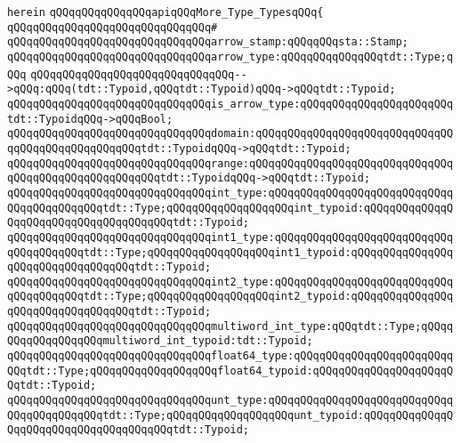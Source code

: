 \verb|herein|\newline
\newline
\verb|qQQqqQQqqQQqqQQqapiqQQqMore_Type_TypesqQQq{|\newline
\verb|qQQqqQQqqQQqqQQqqQQqqQQqqQQqqQQq#|\newline
\verb|qQQqqQQqqQQqqQQqqQQqqQQqqQQqqQQqarrow_stamp:qQQqqQQqsta::Stamp;|\newline
\verb|qQQqqQQqqQQqqQQqqQQqqQQqqQQqqQQqarrow_type:qQQqqQQqqQQqqQQqtdt::Type;qQQq|\newline
\newline
\verb|qQQqqQQqqQQqqQQqqQQqqQQqqQQqqQQq-->qQQq:qQQq(tdt::Typoid,qQQqtdt::Typoid)qQQq->qQQqtdt::Typoid;|\newline
\newline
\verb|qQQqqQQqqQQqqQQqqQQqqQQqqQQqqQQqis_arrow_type:qQQqqQQqqQQqqQQqqQQqqQQqtdt::TypoidqQQq->qQQqBool;|\newline
\verb|qQQqqQQqqQQqqQQqqQQqqQQqqQQqqQQqdomain:qQQqqQQqqQQqqQQqqQQqqQQqqQQqqQQqqQQqqQQqqQQqqQQqqQQqtdt::TypoidqQQq->qQQqtdt::Typoid;|\newline
\verb|qQQqqQQqqQQqqQQqqQQqqQQqqQQqqQQqrange:qQQqqQQqqQQqqQQqqQQqqQQqqQQqqQQqqQQqqQQqqQQqqQQqqQQqqQQqtdt::TypoidqQQq->qQQqtdt::Typoid;|\newline
\newline
\verb|qQQqqQQqqQQqqQQqqQQqqQQqqQQqqQQqint_type:qQQqqQQqqQQqqQQqqQQqqQQqqQQqqQQqqQQqqQQqqQQqtdt::Type;qQQqqQQqqQQqqQQqqQQqint_typoid:qQQqqQQqqQQqqQQqqQQqqQQqqQQqqQQqqQQqqQQqtdt::Typoid;|\newline
\verb|qQQqqQQqqQQqqQQqqQQqqQQqqQQqqQQqint1_type:qQQqqQQqqQQqqQQqqQQqqQQqqQQqqQQqqQQqqQQqtdt::Type;qQQqqQQqqQQqqQQqqQQqint1_typoid:qQQqqQQqqQQqqQQqqQQqqQQqqQQqqQQqqQQqtdt::Typoid;|\newline
\verb|qQQqqQQqqQQqqQQqqQQqqQQqqQQqqQQqint2_type:qQQqqQQqqQQqqQQqqQQqqQQqqQQqqQQqqQQqqQQqtdt::Type;qQQqqQQqqQQqqQQqqQQqint2_typoid:qQQqqQQqqQQqqQQqqQQqqQQqqQQqqQQqqQQqtdt::Typoid;|\newline
\verb|qQQqqQQqqQQqqQQqqQQqqQQqqQQqqQQqmultiword_int_type:qQQqtdt::Type;qQQqqQQqqQQqqQQqqQQqmultiword_int_typoid:tdt::Typoid;|\newline
\verb|qQQqqQQqqQQqqQQqqQQqqQQqqQQqqQQqfloat64_type:qQQqqQQqqQQqqQQqqQQqqQQqqQQqtdt::Type;qQQqqQQqqQQqqQQqqQQqfloat64_typoid:qQQqqQQqqQQqqQQqqQQqqQQqtdt::Typoid;|\newline
\verb|qQQqqQQqqQQqqQQqqQQqqQQqqQQqqQQqunt_type:qQQqqQQqqQQqqQQqqQQqqQQqqQQqqQQqqQQqqQQqqQQqtdt::Type;qQQqqQQqqQQqqQQqqQQqunt_typoid:qQQqqQQqqQQqqQQqqQQqqQQqqQQqqQQqqQQqqQQqtdt::Typoid;|\newline
